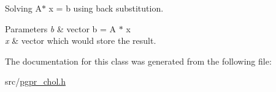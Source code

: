 Solving A$\ast$ x = b using back substitution. 


\begin{DoxyParams}{Parameters}
{\em b} & vector b = A $\ast$ x \\
\hline
{\em x} & vector which would store the result. \\
\hline
\end{DoxyParams}


The documentation for this class was generated from the following file\-:\begin{DoxyCompactItemize}
\item 
src/\hyperlink{pgpr__chol_8h}{pgpr\-\_\-chol.\-h}\end{DoxyCompactItemize}
